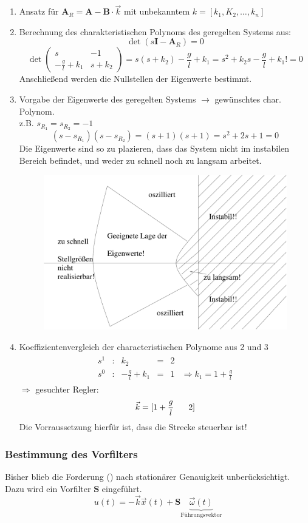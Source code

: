 \message{ !name(Mitschrieb_SysRegel.tex)}\documentclass[12pt,a4paper,ngerman]{scrartcl}
\newcommand{\RM}[1]{\MakeUppercase{\romannumeral #1{.}}}
\begin{document}
\begin{enumerate}
\item Ansatz für $\mathbf{A}_R=\mathbf{A}-\mathbf{B}\cdot \vec{k}$ mit unbekanntem $k=[ k_1,K_2,\dots,k_n ]$
\item Berechnung des charakteristischen Polynoms des geregelten Systems
aus:
\[
\det{(s\mathbf{I}-\mathbf{A}_R)}=0
\]
\[
\det{
  \begin{pmatrix}
    s&-1\\
-\frac{g}{l}+k_1&s+k_2
  \end{pmatrix}
}=s(s+k_2)-\frac{g}{l}+k_1=s^2+k_2s-\frac{g}{l}+k_1!=0
\]
Anschließend werden die Nullstellen der Eigenwerte bestimmt.
\item Vorgabe der Eigenwerte des geregelten Systems $\rightarrow$ gewünschtes char. Polynom.\\
z.B. $s_{R_1}=s_{R_2}=-1$
\[
(s-s_{R_1})(s-s_{R_2})=(s+1)(s+1)=s^2+2s+1=0
\]
Die Eigenwerte sind so zu plazieren, dass das System nicht im instabilen Bereich befindet, und weder zu schnell noch zu langsam arbeitet.
\begin{figure}[H]
  \centering
  \includegraphics[width=.7\linewidth]{sysregel_No_7}
\end{figure}

\item Koeffizientenvergleich der characteristischen Polynome aus 2 und 3\\
  \begin{align*}
    \begin{array}{llllll}
      s^1&:&k_2&=&2\\
      s^0&:&-\frac{g}{l}+k_1&=&1&\Rightarrow k_1=1+\frac{g}{l}
    \end{array}
  \end{align*}
$\Rightarrow$ gesuchter Regler:
\[
\vec{k}=[1+\frac{g}{l}\hspace{0.5cm}\text{ }2]
\]
Die Vorraussetzung hierfür ist, dass die Strecke steuerbar ist!
\end{enumerate}

\subsubsection{Bestimmung des Vorfilters}

Bisher blieb die Forderung (\RM{2}) nach stationärer Genauigkeit unberücksichtigt. Dazu wird ein Vorfilter $\mathbf{S}$ eingeführt.
\[
u(t)=-\vec{k}\vec{x}(t)+\mathbf{S}\underbrace{\vec{\omega}(t)}_{\text{Führungsvektor}}
\]
\end{document}
